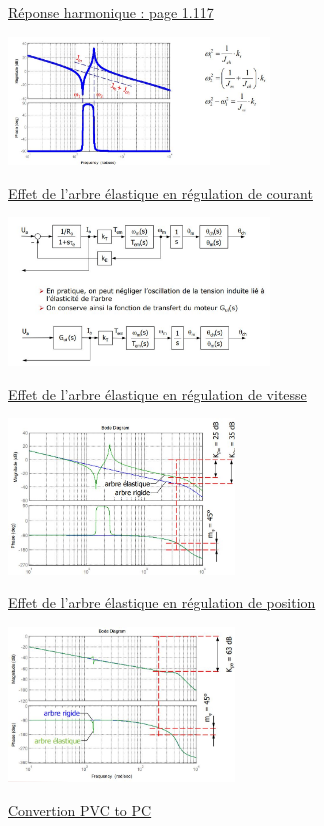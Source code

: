 \documentclass[	DIV=calc,%
							paper=a4,%
							fontsize=10pt,%
							twocolumn]{scrartcl} %
\newcommand{\formtitle}[1]{\large\underline{#1}}
\begin{document}
\formtitle{Réponse harmonique : page 1.117}

\includegraphics[width=0.52\textwidth]{img/arbre_elastique_rep.JPG}


\formtitle{Effet de l’arbre élastique en régulation de courant}

\includegraphics[width=0.52\textwidth]{img/arbre_elastique_bloc.JPG}


\formtitle{Effet de l’arbre élastique en régulation de vitesse}

\includegraphics[width=0.45\textwidth]{img/arbre_elastique_vit.JPG}


\formtitle{Effet de l’arbre élastique en régulation de position}

\includegraphics[width=0.45\textwidth]{img/arbre_elastique_pos.JPG}

\formtitle{Convertion PVC to PC }\\
\end{document}
